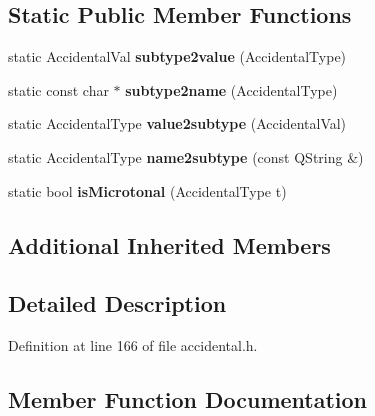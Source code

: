 \subsection*{Static Public Member Functions}
\begin{DoxyCompactItemize}
\item 
\mbox{\label{class_ms_1_1_accidental_afef995d1346c46f2e47536b1009254c6}} 
static Accidental\+Val {\bfseries subtype2value} (Accidental\+Type)
\item 
\mbox{\label{class_ms_1_1_accidental_afcd1d52031e38fb34786ffac5994fbbe}} 
static const char $\ast$ {\bfseries subtype2name} (Accidental\+Type)
\item 
\mbox{\label{class_ms_1_1_accidental_aec2e40efb2e88d1f317f2f4fdcea2e8b}} 
static Accidental\+Type {\bfseries value2subtype} (Accidental\+Val)
\item 
\mbox{\label{class_ms_1_1_accidental_ab8f208c3d654cc87be99d8de97512eb7}} 
static Accidental\+Type {\bfseries name2subtype} (const Q\+String \&)
\item 
\mbox{\label{class_ms_1_1_accidental_a0e55404da9bc484a047166a33dd8ddf0}} 
static bool {\bfseries is\+Microtonal} (Accidental\+Type t)
\end{DoxyCompactItemize}
\subsection*{Additional Inherited Members}


\subsection{Detailed Description}


Definition at line 166 of file accidental.\+h.



\subsection{Member Function Documentation}
\mbox{\label{class_ms_1_1_accidental_a2f343b18d3b10a4fa5e87c35afe80f58}} 
